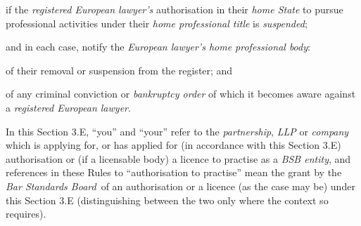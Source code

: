 \item if the \emph{registered European lawyer's} authorisation in their
\emph{home State} to pursue professional activities under their
\emph{home professional title} is \emph{suspended};

and in each case, notify the \emph{European lawyer's home professional
body}:

\item of their removal or suspension from the register; and

\item of any criminal conviction or \emph{bankruptcy order} of which it
becomes aware against a \emph{registered European lawyer}.\la
\ln
{}






In this Section 3.E, ``you'' and ``your'' refer to the
\emph{partnership}, \emph{LLP} or \emph{company} which is applying for,
or has applied for (in accordance with this Section 3.E) authorisation
or (if a licensable body) a licence to practise as a \emph{BSB entity},
and references in these Rules to ``authorisation to practise'' mean the
grant by the \emph{Bar Standards Board}~of an authorisation or a licence
(as the case may be) under this Section 3.E (distinguishing between the
two only where the context so requires).


